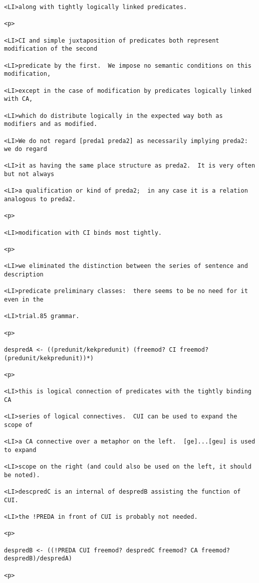 \documentclass[12pt]{article}
\begin{document}
\begin{lstlisting}
<LI>along with tightly logically linked predicates.

<p>

<LI>CI and simple juxtaposition of predicates both represent modification of the second

<LI>predicate by the first.  We impose no semantic conditions on this modification,

<LI>except in the case of modification by predicates logically linked with CA,

<LI>which do distribute logically in the expected way both as modifiers and as modified.

<LI>We do not regard [preda1 preda2] as necessarily implying preda2:  we do regard

<LI>it as having the same place structure as preda2.  It is very often but not always

<LI>a qualification or kind of preda2;  in any case it is a relation analogous to preda2.

<p>

<LI>modification with CI binds most tightly.

<p>

<LI>we eliminated the distinction between the series of sentence and description

<LI>predicate preliminary classes:  there seems to be no need for it even in the

<LI>trial.85 grammar.

<p>

despredA <- ((predunit/kekpredunit) (freemod? CI freemod? (predunit/kekpredunit))*)

<p>

<LI>this is logical connection of predicates with the tightly binding CA

<LI>series of logical connectives.  CUI can be used to expand the scope of

<LI>a CA connective over a metaphor on the left.  [ge]...[geu] is used to expand

<LI>scope on the right (and could also be used on the left, it should be noted).

<LI>descpredC is an internal of despredB assisting the function of CUI.

<LI>the !PREDA in front of CUI is probably not needed.

<p>

despredB <- ((!PREDA CUI freemod? despredC freemod? CA freemod? despredB)/despredA)

<p>


\end{lstlisting}
\end{document}

